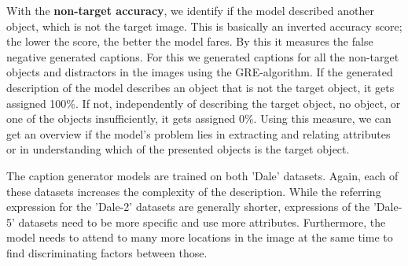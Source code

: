With the \textbf{non-target accuracy}, we identify if the model described another object, which is not the target image.
This is basically an inverted accuracy score; the lower the score, the better the model fares.
By this it measures the false negative generated captions.
For this we generated captions for all the non-target objects and distractors in the images using the GRE-algorithm.
If the generated description of the model describes an object that is not the target object, it gets assigned 100\%.
If not, independently of describing the target object, no object, or one of the objects insufficiently, it gets assigned 0\%.
Using this measure, we can get an overview if the model's problem lies in extracting and relating attributes or in understanding which of the presented objects is the target object.

The caption generator models are trained on both 'Dale' datasets.
Again, each of these datasets increases the complexity of the description.
While the referring expression for the 'Dale-2' datasets are generally shorter, expressions of the 'Dale-5' datasets need to be more specific and use more attributes.
Furthermore, the model needs to attend to many more locations in the image at the same time to find discriminating factors between those.

